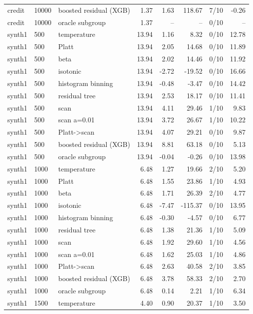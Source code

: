 \begin{tabular}{lllrrrlr}
credit & 10000 & boosted residual (XGB) & 1.37 & 1.63 & 118.67 & 7/10 & -0.26 \\
credit & 10000 & oracle subgroup & 1.37 & -- & -- & 0/10 & -- \\
synth1 & 500 & temperature & 13.94 & 1.16 & 8.32 & 0/10 & 12.78 \\
synth1 & 500 & Platt & 13.94 & 2.05 & 14.68 & 0/10 & 11.89 \\
synth1 & 500 & beta & 13.94 & 2.02 & 14.46 & 0/10 & 11.92 \\
synth1 & 500 & isotonic & 13.94 & -2.72 & -19.52 & 0/10 & 16.66 \\
synth1 & 500 & histogram binning & 13.94 & -0.48 & -3.47 & 0/10 & 14.42 \\
synth1 & 500 & residual tree & 13.94 & 2.53 & 18.17 & 0/10 & 11.41 \\
synth1 & 500 & scan & 13.94 & 4.11 & 29.46 & 1/10 & 9.83 \\
synth1 & 500 & scan a=0.01 & 13.94 & 3.72 & 26.67 & 1/10 & 10.22 \\
synth1 & 500 & Platt->scan & 13.94 & 4.07 & 29.21 & 0/10 & 9.87 \\
synth1 & 500 & boosted residual (XGB) & 13.94 & 8.81 & 63.18 & 0/10 & 5.13 \\
synth1 & 500 & oracle subgroup & 13.94 & -0.04 & -0.26 & 0/10 & 13.98 \\
synth1 & 1000 & temperature & 6.48 & 1.27 & 19.66 & 2/10 & 5.20 \\
synth1 & 1000 & Platt & 6.48 & 1.55 & 23.86 & 1/10 & 4.93 \\
synth1 & 1000 & beta & 6.48 & 1.71 & 26.39 & 2/10 & 4.77 \\
synth1 & 1000 & isotonic & 6.48 & -7.47 & -115.37 & 0/10 & 13.95 \\
synth1 & 1000 & histogram binning & 6.48 & -0.30 & -4.57 & 0/10 & 6.77 \\
synth1 & 1000 & residual tree & 6.48 & 1.38 & 21.36 & 1/10 & 5.09 \\
synth1 & 1000 & scan & 6.48 & 1.92 & 29.60 & 1/10 & 4.56 \\
synth1 & 1000 & scan a=0.01 & 6.48 & 1.62 & 25.03 & 1/10 & 4.86 \\
synth1 & 1000 & Platt->scan & 6.48 & 2.63 & 40.58 & 2/10 & 3.85 \\
synth1 & 1000 & boosted residual (XGB) & 6.48 & 3.78 & 58.33 & 2/10 & 2.70 \\
synth1 & 1000 & oracle subgroup & 6.48 & 0.14 & 2.21 & 1/10 & 6.34 \\
synth1 & 1500 & temperature & 4.40 & 0.90 & 20.37 & 1/10 & 3.50 \\

\end{tabular}
